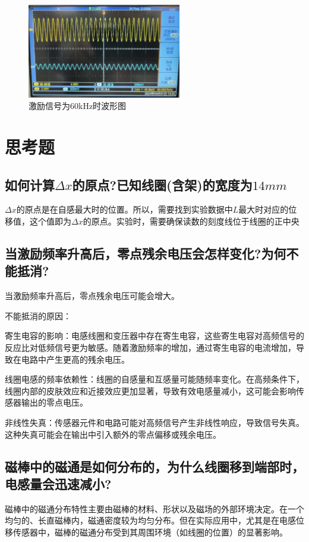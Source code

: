 \documentclass{article}
\begin{document}
\begin{figure}[htbp]
   \centering
   \includegraphics[width=0.6\textwidth]{60k.jpeg}
   \caption{激励信号为60kHz时波形图}
\end{figure}

\newpage

\section{思考题}
\subsection{如何计算$\Delta x$的原点?已知线圈(含架)的宽度为$14mm$}
$\Delta x$的原点是在自感最大时的位置。所以，需要找到实验数据中$L$最大时对应的位移值，这个值即为$\Delta x$的原点。实验时，需要确保读数的刻度线位于线圈的正中央

\subsection{当激励频率升高后，零点残余电压会怎样变化?为何不能抵消?}
当激励频率升高后，零点残余电压可能会增大。

不能抵消的原因：

寄生电容的影响：电感线圈和变压器中存在寄生电容，这些寄生电容对高频信号的反应比对低频信号更为敏感。随着激励频率的增加，通过寄生电容的电流增加，导致在电路中产生更高的残余电压。

线圈电感的频率依赖性：线圈的自感量和互感量可能随频率变化。在高频条件下，线圈内部的皮肤效应和近接效应更加显著，导致有效电感量减小，这可能会影响传感器输出的零点电压。

非线性失真：传感器元件和电路可能对高频信号产生非线性响应，导致信号失真。这种失真可能会在输出中引入额外的零点偏移或残余电压。

\subsection{磁棒中的磁通是如何分布的，为什么线圈移到端部时，电感量会迅速减小?}
磁棒中的磁通分布特性主要由磁棒的材料、形状以及磁场的外部环境决定。在一个均匀的、长直磁棒内，磁通密度较为均匀分布。但在实际应用中，尤其是在电感位移传感器中，磁棒的磁通分布受到其周围环境（如线圈的位置）的显著影响。
\end{document}

